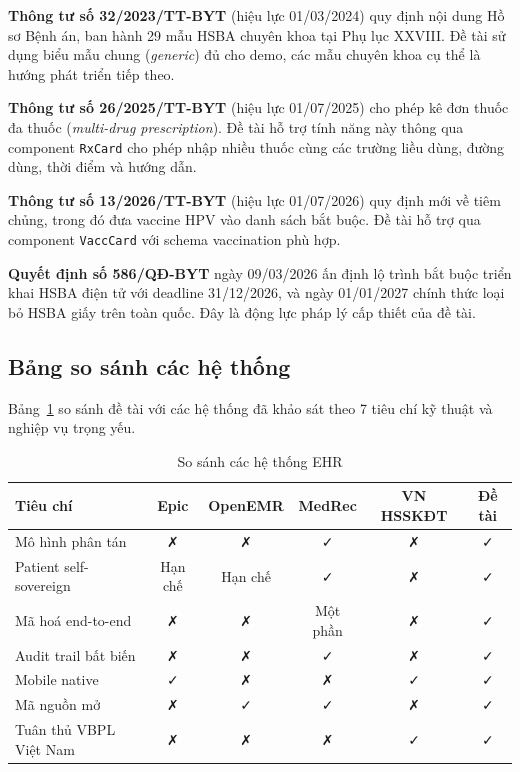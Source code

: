 \documentclass[../DoAn]{subfiles}
\begin{document}
\textbf{Thông tư số 32/2023/TT-BYT} \cite{tt32_2023_byt} (hiệu lực 01/03/2024) quy định nội dung Hồ sơ Bệnh án, ban hành 29 mẫu HSBA chuyên khoa tại Phụ lục XXVIII. Đề tài sử dụng biểu mẫu chung (\textit{generic}) đủ cho demo, các mẫu chuyên khoa cụ thể là hướng phát triển tiếp theo.

\textbf{Thông tư số 26/2025/TT-BYT} \cite{tt26_2025_byt} (hiệu lực 01/07/2025) cho phép kê đơn thuốc đa thuốc (\textit{multi-drug prescription}). Đề tài hỗ trợ tính năng này thông qua component \texttt{RxCard} cho phép nhập nhiều thuốc cùng các trường liều dùng, đường dùng, thời điểm và hướng dẫn.

\textbf{Thông tư số 13/2026/TT-BYT} \cite{tt13_2026_byt} (hiệu lực 01/07/2026) quy định mới về tiêm chủng, trong đó đưa vaccine HPV vào danh sách bắt buộc. Đề tài hỗ trợ qua component \texttt{VaccCard} với schema vaccination phù hợp.

\textbf{Quyết định số 586/QĐ-BYT} \cite{qd586_2026_byt} ngày 09/03/2026 ấn định lộ trình bắt buộc triển khai HSBA điện tử với deadline 31/12/2026, và ngày 01/01/2027 chính thức loại bỏ HSBA giấy trên toàn quốc. Đây là động lực pháp lý cấp thiết của đề tài.

\subsection{Bảng so sánh các hệ thống}

Bảng~\ref{tab:so-sanh-ehr} so sánh đề tài với các hệ thống đã khảo sát theo 7 tiêu chí kỹ thuật và nghiệp vụ trọng yếu.

\begin{table}[h]
\centering
\caption{So sánh các hệ thống EHR}
\label{tab:so-sanh-ehr}
\small
\begin{tabular}{|p{3.2cm}|c|c|c|c|c|}
\hline
\textbf{Tiêu chí} & \textbf{Epic} & \textbf{OpenEMR} & \textbf{MedRec} & \textbf{VN HSSKĐT} & \textbf{Đề tài} \\
\hline
Mô hình phân tán & ✗ & ✗ & ✓ & ✗ & ✓ \\
\hline
Patient self-sovereign & Hạn chế & Hạn chế & ✓ & ✗ & ✓ \\
\hline
Mã hoá end-to-end & ✗ & ✗ & Một phần & ✗ & ✓ \\
\hline
Audit trail bất biến & ✗ & ✗ & ✓ & ✗ & ✓ \\
\hline
Mobile native & ✓ & ✗ & ✗ & ✓ & ✓ \\
\hline
Mã nguồn mở & ✗ & ✓ & ✓ & ✗ & ✓ \\
\hline
Tuân thủ VBPL Việt Nam & ✗ & ✗ & ✗ & ✓ & ✓ \\
\hline
\end{tabular}
\end{table}
\end{document}
